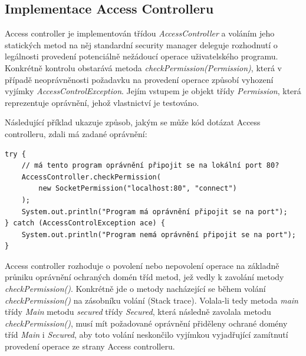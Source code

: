 \subsection{Implementace Access Controlleru}\label{implementaceAC}

Access controller je implementován třídou {\it AccessController} a voláním jeho statických metod na něj standardní security manager deleguje rozhodnutí o legálnosti provedení potenciálně nežádoucí operace uživatelského programu. Konkrétně kontrolu obstarává metoda {\it checkPermission(Permission)}, která v případě neoprávněnosti požadavku na provedení operace způsobí vyhození vyjímky {\it AccessControlException}. Jejím vstupem je objekt třídy {\it Permission}, která reprezentuje oprávnění, jehož vlastnictví je testováno. \cite[5.5]{oaks}\cite[6]{oaks}

Následující příklad ukazuje způsob, jakým se může kód dotázat Access controlleru, zdali má zadané oprávnění: \cite[5.5]{oaks}

\begin{verbatim}
try {
    // má tento program oprávnění připojit se na lokální port 80?
    AccessController.checkPermission(
        new SocketPermission("localhost:80", "connect")
    );
    System.out.println("Program má oprávnění připojit se na port");
} catch (AccessControlException ace) {
    System.out.println("Program nemá oprávnění připojit se na port");
}
\end{verbatim}

Access controller rozhoduje o povolení nebo nepovolení operace na základně průniku oprávnění ochraných domén tříd metod, jež vedly k zavolání metody {\it checkPermission()}. Konkrétně jde o metody nacházející se během volání {\it checkPermission()} na zásobníku volání (Stack trace). Volala-li tedy metoda {\it main} třídy {\it Main} metodu {\it secured} třídy {\it Secured}, která následně zavolala metodu {\it checkPermission()}, musí mít požadované oprávnění přiděleny ochrané domény tříd {\it Main} i {\it Secured}, aby toto volání neskončilo vyjímkou vyjadřující zamítnutí provedení operace ze strany Access controlleru. \cite[5.5]{oaks}\cite[6.1]{oaks}


%

